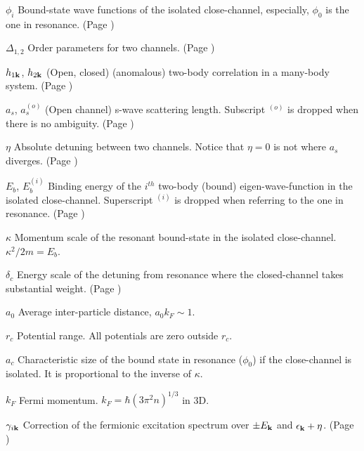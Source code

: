 \documentclass[edeposit,fullpage,prequest,10pt]{uiucthesis2009}
\begin{document}
\begin{symbollist}[0.7in]
\item[$\phi_{i}$] Bound-state wave functions of the isolated close-channel, especially, $\phi_{0}$ is the one in resonance. (Page \pageref{eq:pathInt2:phi})
\item[$\Delta_{1,2}$] Order parameters for two channels. (Page \pageref{eq:pathInt2:identity})
\item[$h_{1\mathbf{k}}$, $ h_{2\mathbf{k}}$] (Open, closed) (anomalous) two-body correlation in a many-body system. (Page \pageref{eq:pathInt2:h2})
\item[$a_{s}$, $a_{s}^{(o)}$] (Open channel) s-wave scattering length. Subscript ${}^{(o)}$ is dropped when there is no ambiguity. (Page \pageref{sec:intro:as})
\item[$\eta$] Absolute detuning between two channels. Notice that $\eta=0$ is not where $a_{s}$ diverges. (Page \pageref{eq:intro:ham})
\item[$E_{b}$, $E_{b}^{(i)}$] Binding energy of the $i^{th}$ two-body (bound) eigen-wave-function in the isolated close-channel.  Superscript ${}^{(i)}$ is dropped when referring to the one in resonance. (Page \pageref{eq:intro:sch2})
\item[$\kappa$] Momentum scale of the resonant bound-state in the isolated close-channel.  $\kappa^{2}/2m=E_{b}$.
\item[$\delta_{c}$] Energy scale of the  detuning from resonance where the closed-channel takes substantial weight. (Page \pageref{eq:intro:deltaC})
\item[$a_{0}$] Average inter-particle distance, $a_{0}k_{F}\sim1$.
\item[$r_{c}$] Potential range.  All  potentials are zero outside $r_{c}$.
\item[$a_{c}$] Characteristic size of the bound state in resonance ($\phi_{0}$) if the close-channel is isolated. It is proportional  to the inverse of $\kappa$.
\item[$k_{F}$] Fermi momentum. $k_{F}=\hbar(3\pi^{2}n)^{1/3}$ in 3D.
\item[$\gamma_{i\mathbf{k}}$] Correction of the fermionic excitation spectrum over $\pm{}E_{\mathbf{k}}$ and $\epsilon_{\mathbf{k}}+\eta$. (Page \pageref{eq:pathInt2:xiExpand})


\end{symbollist}
\end{document}
